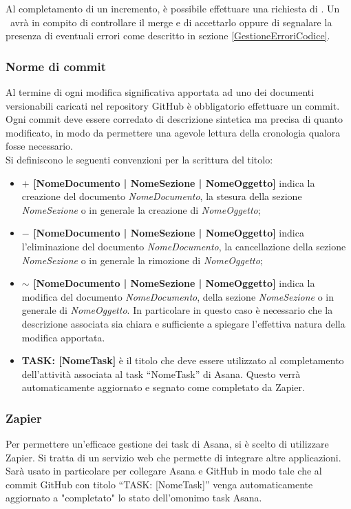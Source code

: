 \documentclass[../NormeDiProgetto.tex]{subfiles}
\begin{document}
			Al completamento di un incremento, è possibile effettuare una richiesta di .
			Un \verificatore\ avrà in compito di controllare il merge e di accettarlo oppure di segnalare
			la presenza di eventuali errori come descritto in sezione \ref{GestioneErroriCodice}.
		\subsubsection{Norme di commit}
			Al termine di ogni modifica significativa apportata ad uno dei documenti versionabili caricati nel
			repository GitHub è obbligatorio effettuare un commit. Ogni commit deve essere corredato di
			descrizione sintetica ma precisa di quanto modificato, in modo da permettere una agevole lettura
			della cronologia qualora fosse necessario.\\
			Si definiscono le seguenti convenzioni per la scrittura del titolo:
			\begin{itemize}
				\item \textbf{$ + $ [NomeDocumento | NomeSezione | NomeOggetto]} indica la creazione del
				documento \textit{NomeDocumento}, la stesura della sezione \textit{NomeSezione} o in generale
				la creazione di \textit{NomeOggetto};
				\item \textbf{$ - $ [NomeDocumento | NomeSezione | NomeOggetto]} indica l'eliminazione del
				documento \textit{NomeDocumento}, la cancellazione della sezione \textit{NomeSezione} o in
				generale la rimozione di \textit{NomeOggetto};
				\item \textbf{$ \sim $ [NomeDocumento | NomeSezione | NomeOggetto]} indica la modifica del
				documento \textit{NomeDocumento}, della sezione \textit{NomeSezione} o in generale di
				\textit{NomeOggetto}. In particolare in questo caso è necessario che la descrizione associata
				sia chiara e sufficiente a spiegare l'effettiva natura della modifica apportata.
				\item \textbf{TASK: [NomeTask]} è il titolo che deve essere utilizzato al completamento
				dell'attività associata al task ``NomeTask'' di Asana. Questo verrà automaticamente aggiornato
				e segnato come completato da Zapier.
			\end{itemize}
				\subsubsection{Zapier}\label{Zapier}
				Per permettere un'efficace gestione dei task di Asana, si è scelto di utilizzare Zapier. Si tratta
				di un servizio web che permette di integrare altre applicazioni. Sarà usato in particolare per
				collegare Asana e GitHub in modo tale che al commit GitHub con titolo ``TASK: [NomeTask]''
				venga automaticamente aggiornato a "completato" lo stato dell'omonimo task Asana.
\end{document}
